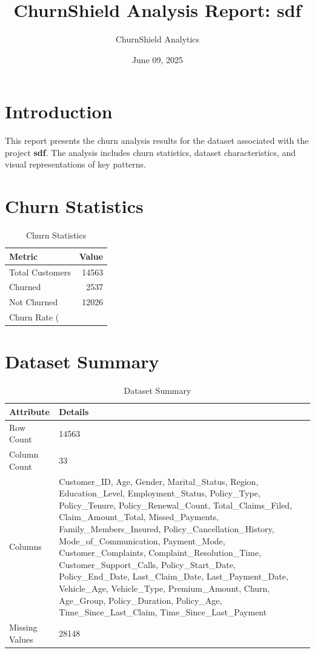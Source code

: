 \documentclass[a4paper,12pt]{article}
\begin{document}
\title{ChurnShield Analysis Report: sdf}
\author{ChurnShield Analytics}
\date{ June 09, 2025 }
\maketitle

\section{Introduction}
This report presents the churn analysis results for the dataset associated with the project \textbf{sdf}. The analysis includes churn statistics, dataset characteristics, and visual representations of key patterns.

\section{Churn Statistics}
\begin{table}[h]
\centering
\begin{tabular}{lr}
\toprule
Metric & Value \\
\midrule
Total Customers & 14563 \\
Churned & 2537 \\
Not Churned & 12026 \\
Churn Rate (%
\bottomrule
\end{tabular}
\caption{Churn Statistics}
\label{tab:churn_stats}
\end{table}

\section{Dataset Summary}
\begin{table}[h]
\centering
\begin{tabular}{ll}
\toprule
Attribute & Details \\
\midrule
Row Count & 14563 \\
Column Count & 33 \\
Columns & Customer_ID, Age, Gender, Marital_Status, Region, Education_Level, Employment_Status, Policy_Type, Policy_Tenure, Policy_Renewal_Count, Total_Claims_Filed, Claim_Amount_Total, Missed_Payments, Family_Members_Insured, Policy_Cancellation_History, Mode_of_Communication, Payment_Mode, Customer_Complaints, Complaint_Resolution_Time, Customer_Support_Calls, Policy_Start_Date, Policy_End_Date, Last_Claim_Date, Last_Payment_Date, Vehicle_Age, Vehicle_Type, Premium_Amount, Churn, Age_Group, Policy_Duration, Policy_Age, Time_Since_Last_Claim, Time_Since_Last_Payment \\
Missing Values & 28148 \\
\bottomrule
\end{tabular}
\caption{Dataset Summary}
\label{tab:dataset_summary}
\end{table}
\end{document}

